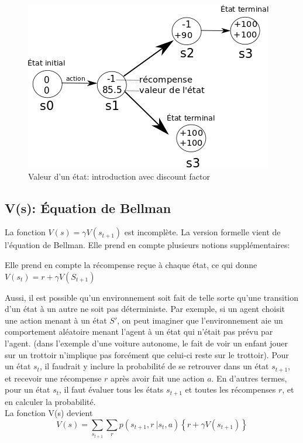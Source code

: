 \documentclass[11pt,a4paper]{report}
\begin{document}
    \begin{figure}[!h]
    \center
    \includegraphics[scale=0.60]{ressources/introduction_function_value_4.png}
    \caption{Valeur d'un état: introduction avec discount factor}
    \end{figure} 
    
  \subsection{V(s): Équation de Bellman}
  
    \par La fonction $V(s) = \gamma V(s_{t+1})$ est incomplète. La version formelle vient de l'équation de Bellman. Elle prend en compte plusieurs notions  supplémentaires: 
    
    \par Elle prend en compte la récompense reçue à chaque état, ce qui donne \\ $V(s_t) = r + \gamma V(S_{t+1})$
    
    \par Aussi, il est possible qu'un environnement soit fait de telle sorte qu'une transition d'un état à un autre ne soit pas déterministe. Par exemple, si un agent choisit une action menant à un état $S'$, on peut imaginer que l'environnement aie un comportement aléatoire menant l'agent à un état qui n'était pas prévu par l'agent. (dans l'exemple d'une voiture autonome, le fait de voir un enfant jouer sur un trottoir n'implique pas forcément que celui-ci reste sur le trottoir). Pour un état $s_t$, il faudrait y inclure la probabilité de se retrouver dans un état $s_{t+1}$, et recevoir une récompense $r$ après avoir fait une action $a$. En d'autres termes, pour un état $s_t$, il faut évaluer tous les états $s_{t+1}$ et toutes les récompenses $r$, et en calculer la probabilité. \\
    La fonction V(s) devient $$V(s) = \sum_{s_{t+1}}\sum_rp(s_{t+1},r\ |s_t,a)\left\{r+\gamma V(s_{t+1})\right\}$$
    
\end{document}
